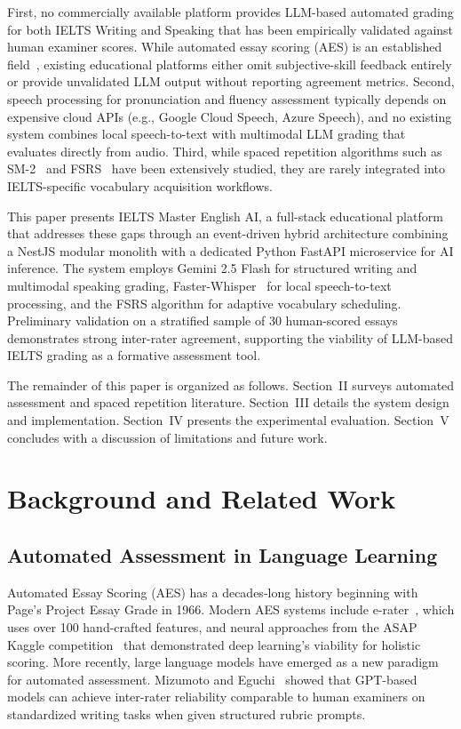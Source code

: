 \documentclass[conference]{IEEEtran}
\begin{document}
First, no commercially available platform provides LLM-based automated grading for both IELTS Writing and Speaking that has been empirically validated against human examiner scores. While automated essay scoring (AES) is an established field~\cite{erater}, existing educational platforms either omit subjective-skill feedback entirely or provide unvalidated LLM output without reporting agreement metrics. Second, speech processing for pronunciation and fluency assessment typically depends on expensive cloud APIs (e.g., Google Cloud Speech, Azure Speech), and no existing system combines local speech-to-text with multimodal LLM grading that evaluates directly from audio. Third, while spaced repetition algorithms such as SM-2~\cite{sm2} and FSRS~\cite{fsrs} have been extensively studied, they are rarely integrated into IELTS-specific vocabulary acquisition workflows.

This paper presents IELTS Master English AI, a full-stack educational platform that addresses these gaps through an event-driven hybrid architecture combining a NestJS modular monolith with a dedicated Python FastAPI microservice for AI inference. The system employs Gemini 2.5 Flash for structured writing and multimodal speaking grading, Faster-Whisper~\cite{faster_whisper} for local speech-to-text processing, and the FSRS algorithm for adaptive vocabulary scheduling. Preliminary validation on a stratified sample of 30 human-scored essays demonstrates strong inter-rater agreement, supporting the viability of LLM-based IELTS grading as a formative assessment tool.

The remainder of this paper is organized as follows. Section~II surveys automated assessment and spaced repetition literature. Section~III details the system design and implementation. Section~IV presents the experimental evaluation. Section~V concludes with a discussion of limitations and future work.

\section{Background and Related Work}

\subsection{Automated Assessment in Language Learning}

Automated Essay Scoring (AES) has a decades-long history beginning with Page's Project Essay Grade in 1966. Modern AES systems include e-rater~\cite{erater}, which uses over 100 hand-crafted features, and neural approaches from the ASAP Kaggle competition~\cite{asap} that demonstrated deep learning's viability for holistic scoring. More recently, large language models have emerged as a new paradigm for automated assessment. Mizumoto and Eguchi~\cite{llm_aes} showed that GPT-based models can achieve inter-rater reliability comparable to human examiners on standardized writing tasks when given structured rubric prompts.
\end{document}
